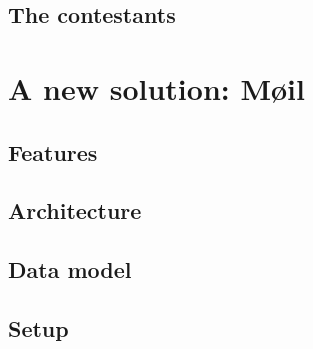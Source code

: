 \documentclass[12pt,a4paper]{scrartcl}
\begin{document}
		\subsection*{The contestants}

	\section*{A new solution: Møil}

		\subsection*{Features}

		\subsection*{Architecture}

		\subsection*{Data model}

		\subsection*{Setup}

	\printbibliography
\end{document}
